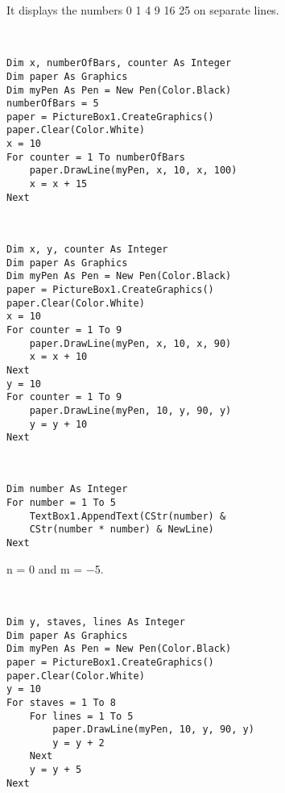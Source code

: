 		\begin{stab}
			\begin{enumChapter}
				\item	It displays the numbers 0 1 4 9 16 25 on separate lines.
				\item	\ \begin{lstlisting}
Dim x, numberOfBars, counter As Integer
Dim paper As Graphics
Dim myPen As Pen = New Pen(Color.Black)
numberOfBars = 5
paper = PictureBox1.CreateGraphics()
paper.Clear(Color.White)
x = 10
For counter = 1 To numberOfBars
	paper.DrawLine(myPen, x, 10, x, 100)	
	x = x + 15
Next
					\end{lstlisting}
				\item \
					\begin{lstlisting}
Dim x, y, counter As Integer
Dim paper As Graphics
Dim myPen As Pen = New Pen(Color.Black)
paper = PictureBox1.CreateGraphics()	
paper.Clear(Color.White)
x = 10
For counter = 1 To 9
	paper.DrawLine(myPen, x, 10, x, 90)
	x = x + 10
Next
y = 10
For counter = 1 To 9
	paper.DrawLine(myPen, 10, y, 90, y)
	y = y + 10
Next
					\end{lstlisting}
				\item \
					\begin{lstlisting}
Dim number As Integer
For number = 1 To 5
	TextBox1.AppendText(CStr(number) &
	CStr(number * number) & NewLine)
Next
					\end{lstlisting}
				\item	n = 0 and m = −5.
				\item \
					\begin{lstlisting}
Dim y, staves, lines As Integer
Dim paper As Graphics
Dim myPen As Pen = New Pen(Color.Black)
paper = PictureBox1.CreateGraphics()
paper.Clear(Color.White)
y = 10
For staves = 1 To 8
	For lines = 1 To 5
		paper.DrawLine(myPen, 10, y, 90, y)
		y = y + 2
	Next
	y = y + 5
Next
					\end{lstlisting}
			\end{enumChapter}
		\end{stab}%
